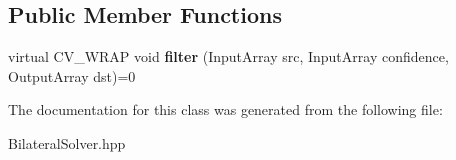\subsection*{Public Member Functions}
\begin{DoxyCompactItemize}
\item 
virtual C\+V\+\_\+\+W\+R\+AP void {\bfseries filter} (Input\+Array src, Input\+Array confidence, Output\+Array dst)=0\hypertarget{classcv_1_1xim_1_1FastBilateralSolverFilter_ad5361179e54020630af33c08b713a0d2}{}\label{classcv_1_1xim_1_1FastBilateralSolverFilter_ad5361179e54020630af33c08b713a0d2}

\end{DoxyCompactItemize}


The documentation for this class was generated from the following file\+:\begin{DoxyCompactItemize}
\item 
Bilateral\+Solver.\+hpp\end{DoxyCompactItemize}
